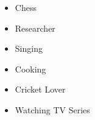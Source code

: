









\begin{multicols}{2}
\begin{itemize}
\item Chess 
\item Researcher
    \item Singing
    \item Cooking
    \item Cricket Lover
    \item Watching TV Series 
\end{itemize}    
\end{multicols}





 \vspace{4cm}

\updateinfo
